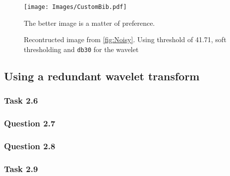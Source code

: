 \documentclass[a4paper]{article}
\begin{document}
    \begin{figure}[H]
	\centering
	\texttt{[image: Images/CustomBib.pdf]}
	\caption{Recontructed image from \cref{fig:Noisy}. Using threshold of 41.71, soft thresholding and \texttt{db30} for the wavelet}
	\label{fig:CusBib}
	
	The better image is a matter of preference.
	
\end{figure}
	

	
	
	
	
    \subsection{Using a redundant wavelet transform}

    \subsubsection{Task 2.6}

    \subsubsection{Question 2.7}

    \subsubsection{Question 2.8}

    \subsubsection{Task 2.9}
\end{document}
